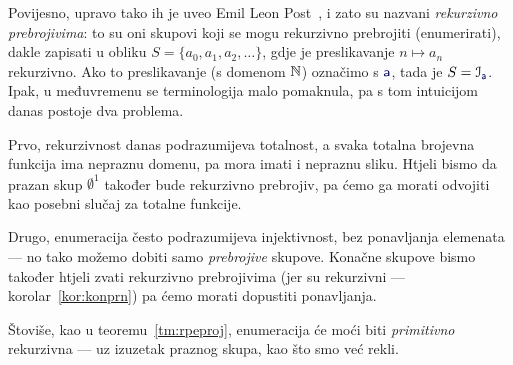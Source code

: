 Povijesno, upravo tako ih je uveo Emil Leon Post~\cite{post}, i zato su nazvani \emph{rekurzivno prebrojivima}: to su oni skupovi koji se mogu rekurzivno prebrojiti (enumerirati), dakle zapisati u obliku $S=\{a_0,a_1,a_2,\dotsc\}$, gdje je preslikavanje $n\mapsto a_n$ rekurzivno. Ako to preslikavanje (s domenom ${\mathbb N}$) označimo s $\f a$, tada je $S=\im{\f a}$. Ipak, u međuvremenu se terminologija malo pomaknula, pa s tom intuicijom danas postoje dva problema.

Prvo, rekurzivnost danas podrazumijeva totalnost, a svaka totalna brojevna funkcija ima nepraznu domenu, pa mora imati i nepraznu sliku. Htjeli bismo da prazan skup $\emptyset^1$ također bude rekurzivno prebrojiv, pa ćemo ga morati odvojiti kao posebni slučaj za totalne funkcije.

Drugo, enumeracija često podrazumijeva injektivnost, bez ponavljanja elemenata --- no tako možemo dobiti samo \emph{prebrojive} skupove. Konačne skupove bismo također htjeli zvati rekurzivno prebrojivima (jer su rekurzivni --- korolar~\ref{kor:konprn}) pa ćemo morati dopustiti ponavljanja.

Štoviše, kao u teoremu~\ref{tm:rpeproj}, enumeracija će moći biti \emph{primitivno} rekurzivna --- uz izuzetak praznog skupa, kao što smo već rekli.

